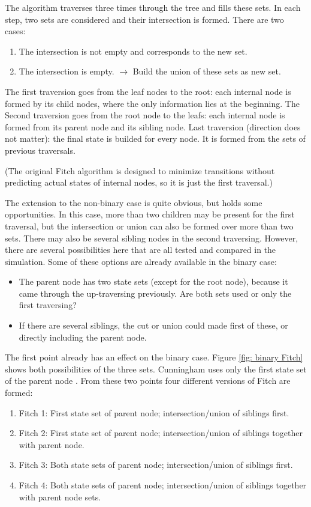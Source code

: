       The algorithm traverses three times through the tree and fills these sets. In each step, two sets 
        are considered and their intersection is formed. There are two cases:
      \begin{enumerate}
        \item The intersection is not empty and corresponds to the new set.
        \item The intersection is empty. $\rightarrow$ Build the union of these sets as new set.
      \end{enumerate}
      The first traversion goes from the leaf nodes to the root: each internal node is formed by its 
        child nodes, where the only information lies at the beginning. The Second traversion goes from 
        the root node to the leafs: each internal node is formed from its parent node and its sibling 
        node. Last traversion (direction does not matter): the final state is builded for every node. It 
        is formed from the sets of previous traversals.

      (The original Fitch algorithm is designed to minimize transitions without predicting actual states 
        of internal nodes, so it is just the first traversal.)

      The extension to the non-binary case is quite obvious, but holds some opportunities. In this case, 
        more than two children may be present for the first traversal, but the intersection or union can 
        also be formed over more than two sets. There may also be several sibling nodes in the second 
        traversing. However, there are several possibilities here that are all tested and compared in 
        the simulation. Some of these options are already available in the binary case:
      \begin{itemize}
        \item The parent node has two state sets (except for the root node), because it came through 
          the up-traversing previously. Are both sets used or only the first traversing?
        \item If there are several siblings, the cut or union could made first of these, or directly 
          including the parent node.
      \end{itemize}
      The first point already has an effect on the binary case. Figure \ref{fig: binary Fitch} shows 
        both possibilities of the three sets. Cunningham uses only the first state set of the parent 
        node \cite{Cunningham1998}. From these two points four different versions of Fitch are formed:
      \begin{enumerate}
        \item Fitch 1: First state set of parent node; intersection/union of siblings first.
        \item Fitch 2: First state set of parent node; intersection/union of siblings together with parent node.
        \item Fitch 3: Both state sets of parent node; intersection/union of siblings first.
        \item Fitch 4: Both state sets of parent node; intersection/union of siblings together with parent node sets.
      \end{enumerate}

